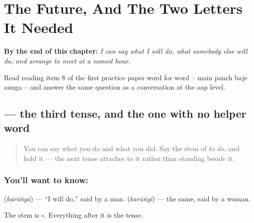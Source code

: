 
\chapter{The Future, And The Two Letters It Needed}
\label{ch:hi-bhavishya}

\begin{chapteropening}
\textbf{By the end of this chapter:} \emph{I can say what I will do, what somebody else will do, and arrange to meet at a named hour.}

Read reading item 8 of the first practice paper word for word -- main panch baje aunga -- and answer the same question as a conversation at the aap level.
\end{chapteropening}

\section[\texorpdfstring{\hi{करूँगा} (karūṅgā)}{करूँगा (karūṅgā)}]{ — the third tense, and the one with no helper word}

\label{lesson:HI-C88-karunga}



\begin{quote}
You can say what you do and what you did. Say the stem of \emph{to do}, and hold it — the next tense attaches to it rather than standing beside it.
\end{quote}

\subsection*{You'll want to know: }
\textbf{} (\emph{karūṅgā}) — \textquotedblleft{}I will do,\textquotedblright{} said by a man. \textbf{} (\emph{karūṅgī}) — the same, said by a woman.

The stem is \textbf{-}. Everything after it is the tense.

